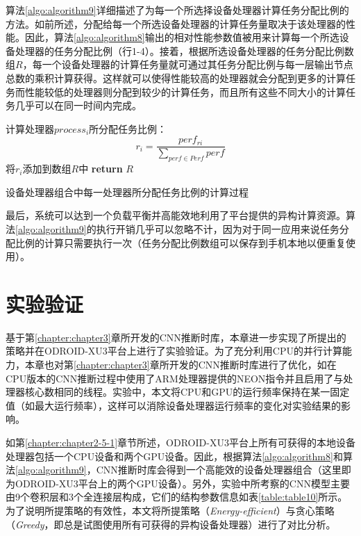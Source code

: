 算法\ref{algo:algorithm9}详细描述了为每一个所选择设备处理器计算任务分配比例的方法。如前所述，分配给每一个所选设备处理器的计算任务量取决于该处理器的性能。因此，算法\ref{algo:algorithm8}输出的相对性能参数值被用来计算每一个所选设备处理器的任务分配比例（行1-4）。接着，根据所选设备处理器的任务分配比例数组$R$，每一个设备处理器的计算任务量就可通过其任务分配比例与每一层输出节点总数的乘积计算获得。这样就可以使得性能较高的处理器就会分配到更多的计算任务而性能较低的处理器则分配到较少的计算任务，而且所有这些不同大小的计算任务几乎可以在同一时间内完成。

\begin{algorithm}[htbp]
  \small
  \SetAlgoLined
    \begin{spacing}{0.9}
     {
        计算处理器$process_i$所分配任务比例：
        $$r_i=\frac{perf_{ri}}{\sum_{perf \in Perf}perf}$$
        将$r_i$添加到数组$R$中\;
    }
    \textbf{return} $R$\;
   \end{spacing}
  \caption{设备处理器组合中每一处理器所分配任务比例的计算过程}
  \label{algo:algorithm9}
\end{algorithm}

最后，系统可以达到一个负载平衡并高能效地利用了平台提供的异构计算资源。算法\ref{algo:algorithm9}的执行开销几乎可以忽略不计，因为对于同一应用来说任务分配比例的计算只需要执行一次（任务分配比例数组可以保存到手机本地以便重复使用）。


\section{实验验证}
\label{chapter:chapter4-4}
基于第\ref{chapter:chapter3}章所开发的CNN推断时库，本章进一步实现了所提出的策略并在ODROID-XU3平台上进行了实验验证。为了充分利用CPU的并行计算能力，本章也对第\ref{chapter:chapter3}章所开发的CNN推断时库进行了优化，如在CPU版本的CNN推断过程中使用了ARM处理器提供的NEON指令并且启用了与处理器核心数相同的线程。实验中，本文将CPU和GPU的运行频率保持在某一固定值（如最大运行频率），这样可以消除设备处理器运行频率的变化对实验结果的影响。

如第\ref{chapter:chapter2-5-1}章节所述，ODROID-XU3平台上所有可获得的本地设备处理器包括一个CPU设备和两个GPU设备。因此，根据算法\ref{algo:algorithm8}和算法\ref{algo:algorithm9}，CNN推断时库会得到一个高能效的设备处理器组合（这里即为ODROID-XU3平台上的两个GPU设备）。另外，实验中所考察的CNN模型主要由9个卷积层和3个全连接层构成，它们的结构参数信息如表\ref{table:table10}所示。为了说明所提策略的有效性，本文将所提策略（\emph{Energy-efficient}）与贪心策略（\emph{Greedy}，即总是试图使用所有可获得的异构设备处理器）进行了对比分析。

